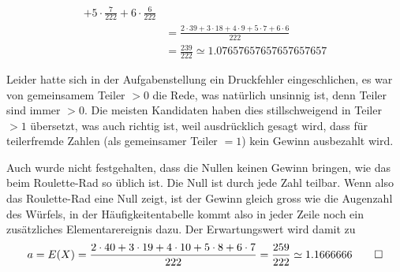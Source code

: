 \begin{loesung}
\begin{teilaufgaben}
\begin{align*}
+5\cdot\frac{7}{222}+6\cdot\frac6{222}
\\
&=\frac{
2\cdot 39+3\cdot 18+4\cdot 9+5\cdot 7 +6\cdot 6
}{222}
\\
&=\frac{ 239 }{222}
\simeq 1.07657657657657657657
\end{align*}
\end{teilaufgaben}
Leider hatte sich in der Aufgabenstellung ein Druckfehler eingeschlichen,
es war von gemeinsamem Teiler $> 0$ die Rede, was natürlich unsinnig ist,
denn Teiler sind immer $> 0$. Die meisten Kandidaten haben dies stillschweigend
in Teiler $>1$ übersetzt, was auch richtig ist, weil ausdrücklich
gesagt wird, dass für teilerfremde Zahlen (als gemeinsamer Teiler $= 1$)
kein Gewinn ausbezahlt wird.

Auch wurde nicht festgehalten,
dass die Nullen keinen Gewinn bringen, wie das beim Roulette-Rad so
üblich ist. Die Null ist durch jede Zahl teilbar. Wenn also das Roulette-Rad
eine Null zeigt, ist der Gewinn gleich gross wie die Augenzahl des Würfels,
in der Häufigkeitentabelle kommt also in jeder Zeile noch ein zusätzliches
Elementarereignis dazu. Der Erwartungswert wird damit zu
\[
a=E(X)=
\frac{2\cdot 40+3\cdot 19+4\cdot 10+5\cdot 8+6\cdot 7}{222}
=
\frac{259}{222}
\simeq
1.1666666
\qedhere
\]
\end{loesung}

